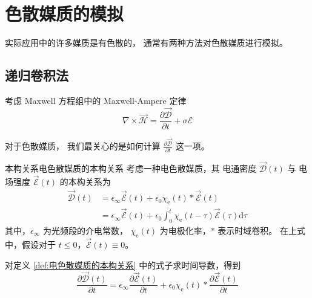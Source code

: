 \section{色散媒质的模拟}

\par 实际应用中的许多媒质是有色散的，
通常有两种方法对色散媒质进行模拟。

\subsection{递归卷积法}

\par 考虑 Maxwell 方程组中的 Maxwell-Ampere 定律
\begin{equation}
    \nabla \times \vec{\mathscr{H}}=
    \frac{\partial \vec{\mathscr{D}}}{\partial t}
    +\sigma \mathscr{E}
\end{equation}
\par 对于色散媒质，
我们最关心的是如何计算 $\frac{\partial \vec{\mathscr{D}}}{\partial t}$
这一项。

\begin{definition}{本构关系}{电色散媒质的本构关系}
    考虑一种电色散媒质，其
    电通密度 $\vec{\mathscr{D}}(t)$ 与
    电场强度 $\vec{\mathscr{E}}(t)$ 的本构关系为
    \begin{equation}
        \begin{aligned}
            \vec{\mathscr{D}}(t)
            &=\epsilon_{\infty}\vec{\mathscr{E}}(t)
            +\epsilon_0 \chi_{\text{e}}(t) * \vec{\mathscr{E}}(t)\\
            &=\epsilon_{\infty}\vec{\mathscr{E}}(t)
            +\epsilon_0 \int_{0}^{t}
            \chi_{\text{e}}(t-\tau)\vec{\mathscr{E}}(\tau)\text{d}\tau
        \end{aligned}
    \end{equation}
    其中，$\epsilon_{\infty}$ 为光频段的介电常数，
    $\chi_{\text{e}}(t)$ 为电极化率，$*$ 表示时域卷积。
    在上式中，假设对于 $t\leq0$，$\vec{\mathscr{E}}(t)\equiv0$。
\end{definition}

\par 对定义 \ref{def:电色散媒质的本构关系} 中的式子求时间导数，得到
\begin{equation}
    \frac{\partial \vec{\mathscr{D}}(t)}{\partial t}
    =\epsilon_{\infty}\frac{\partial \vec{\mathscr{E}}(t)}{\partial t}
    +\epsilon_0 \chi_{\text{e}}(t) * \frac{\partial \vec{\mathscr{E}}(t)}{\partial t}
    \label{色散媒质的电通密度时间导数}
\end{equation}

